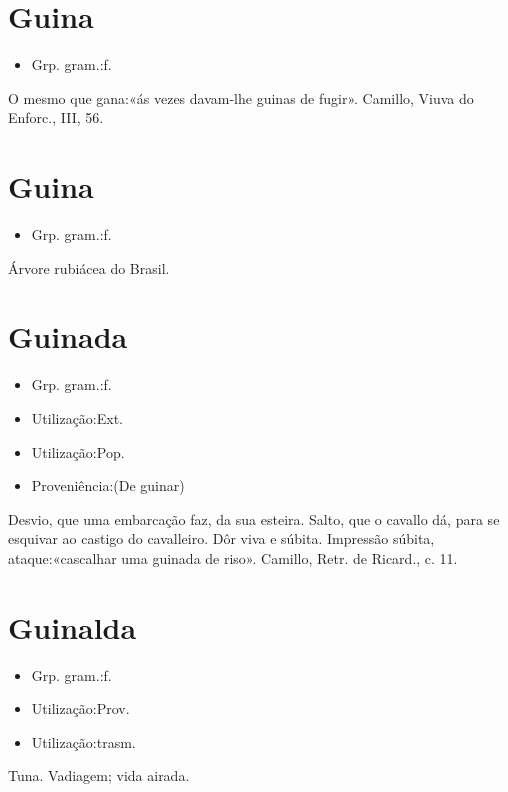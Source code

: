 \section{Guina}
\begin{itemize}
\item {Grp. gram.:f.}
\end{itemize}
O mesmo que \textunderscore gana\textunderscore :«\textunderscore ás vezes davam-lhe guinas de fugir\textunderscore ». Camillo, \textunderscore Viuva do Enforc.\textunderscore , III, 56.
\section{Guina}
\begin{itemize}
\item {Grp. gram.:f.}
\end{itemize}
Árvore rubiácea do Brasil.
\section{Guinada}
\begin{itemize}
\item {Grp. gram.:f.}
\end{itemize}
\begin{itemize}
\item {Utilização:Ext.}
\end{itemize}
\begin{itemize}
\item {Utilização:Pop.}
\end{itemize}
\begin{itemize}
\item {Proveniência:(De \textunderscore guinar\textunderscore )}
\end{itemize}
Desvio, que uma embarcação faz, da sua esteira.
Salto, que o cavallo dá, para se esquivar ao castigo do cavalleiro.
Dôr viva e súbita.
Impressão súbita, ataque:«\textunderscore cascalhar uma guinada de riso\textunderscore ». Camillo, \textunderscore Retr. de Ricard.\textunderscore , c. 11.
\section{Guinalda}
\begin{itemize}
\item {Grp. gram.:f.}
\end{itemize}
\begin{itemize}
\item {Utilização:Prov.}
\end{itemize}
\begin{itemize}
\item {Utilização:trasm.}
\end{itemize}
Tuna.
Vadiagem; vida airada.
